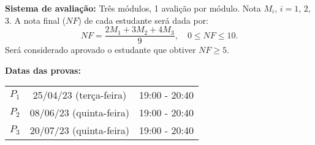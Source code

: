 \documentclass{beamer}
\begin{document}
    \begin{frame}
        {\bf{Sistema de avaliação:}} Três módulos, 1 avalição por módulo.
            Nota $M_i$, $i=1$, 2, 3. A nota final ($NF$) de cada estudante ser\'a dada por:
        \[
            NF = \dfrac{2M_1 + 3M_2 + 4M_3}{9}, \quad 0 \le NF \le 10.
        \]
        Ser\'a considerado aprovado o estudante que obtiver $NF \ge 5$.
    \end{frame}

    \begin{frame}
        \bf{Datas das provas:}
        \begin{center}
            \begin{tabular}{c|c|c}
                \hline\hline
                \hspace{1cm}{\bf Prova}\hspace{1cm} & \hspace{3cm}{\bf Data}\hspace{3cm} & \hspace{1.7cm}{\bf Hor\'{a}rio}\hspace{1.7cm} \\
                \hline\hline
                $P_1$ & 25/04/23 (terça-feira) \phantom{x} & 19:00 - 20:40 \\
                \hline
                $P_2$ & 08/06/23 (quinta-feira) \phantom{x} & 19:00 - 20:40 \\
                \hline
                $P_3$ & 20/07/23 (quinta-feira) \phantom{x} & 19:00 - 20:40 \\
                \hline\hline
            \end{tabular}
        \end{center}
    \end{frame}
\end{document}
